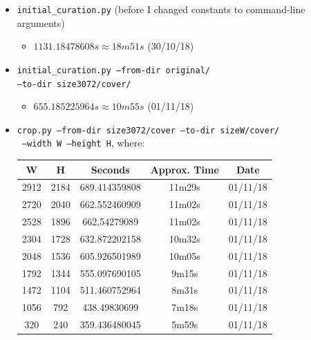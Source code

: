 \documentclass[11pt,a4paper]{report}
\begin{document}
\begin{itemize}

\item \texttt{initial\_curation.py} (before I changed constants to command-line arguments)
  \begin{itemize}
  \item $1131.18478608s \approx 18m51s$ (30/10/18)
  \end{itemize}

\item \texttt{initial\_curation.py --from-dir original/} \\ \texttt{--to-dir size3072/cover/}
  \begin{itemize}
  \item $655.185225964s \approx 10m55s$ (01/11/18)
  \end{itemize}

\item \texttt{crop.py --from-dir size3072/cover --to-dir sizeW/cover/} \\
         \texttt{ --width W --height H}, where:
  \begin{center}
  \begin{tabular}{ c c | c c | c }
  W & H & Seconds & Approx. Time & Date\\ \hline
  2912 & 2184 & 689.414359808 & 11m29s & 01/11/18 \\
  2720 & 2040 & 662.552460909 & 11m02s & 01/11/18 \\
  2528 & 1896 & 662.54279089 & 11m02s & 01/11/18 \\
  2304 & 1728 & 632.872202158 & 10m32s & 01/11/18 \\
  2048 & 1536 & 605.926501989 & 10m05s & 01/11/18 \\
  1792 & 1344 & 555.097690105 & 9m15s & 01/11/18 \\
  1472 & 1104 & 511.460752964 & 8m31s & 01/11/18 \\
  1056 & 792 & 438.49830699 & 7m18s & 01/11/18 \\
  320 & 240 & 359.436480045 & 5m59s & 01/11/18 \\
  \end{tabular}
  \end{center}


\end{itemize}
\end{document}

